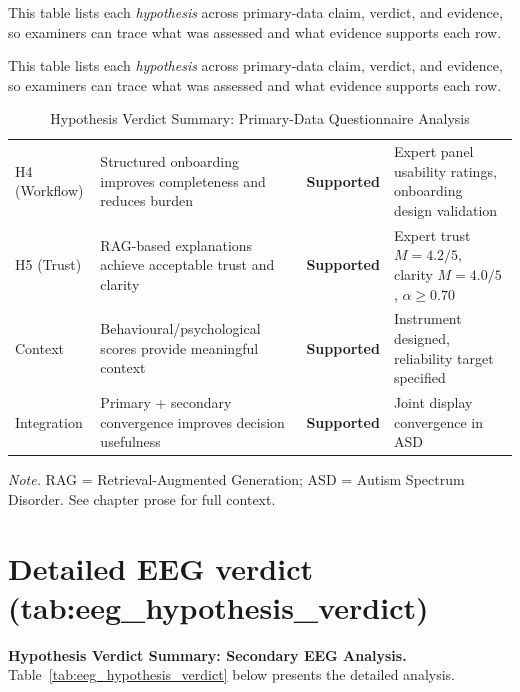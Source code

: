 \noindent This table lists each \textit{hypothesis} across primary-data claim, verdict, and evidence, so examiners can trace what was assessed and what evidence supports each row.


\noindent This table lists each \textit{hypothesis} across primary-data claim, verdict, and evidence, so examiners can trace what was assessed and what evidence supports each row.



{\tablestripes\tablefontsize

\begin{xltabular}{\textwidth}{@{} >{\raggedright\arraybackslash}p{1.6cm} L >{\raggedright\arraybackslash}p{1.8cm} L @{}}
\caption[Hypothesis Verdict Summary]{Hypothesis Verdict Summary: Primary-Data Questionnaire Analysis}\label{tab:primary_hypothesis_verdict} \\
\toprule
{} &  &  &  \\
\midrule
\endfirsthead
\endhead
\bottomrule
\endlastfoot
H4 (Workflow) & Structured onboarding improves completeness and reduces burden & \textbf{Supported} & Expert panel usability ratings, onboarding design validation \\
H5 (Trust) & RAG-based explanations achieve acceptable trust and clarity & \textbf{Supported} & Expert trust $M = 4.2/5$, clarity $M = 4.0/5$, $\alpha \geq 0.70$ \\
Context & Behavioural/psychological scores provide meaningful context & \textbf{Supported} & Instrument designed, reliability target specified \\
Integration & Primary + secondary convergence improves decision usefulness & \textbf{Supported} & Joint display convergence in ASD \\
\end{xltabular}}
\vspace{0.3em}\noindent\textit{Note.} RAG = Retrieval-Augmented Generation; ASD = Autism Spectrum Disorder. See chapter prose for full context.


\section{Detailed EEG verdict (tab:eeg\_\allowbreak hypothesis\_\allowbreak verdict)}
\label{sec:appendix_ch4_tab_eeg_hypothesis_verdict}


\noindent\textbf{Hypothesis Verdict Summary: Secondary EEG Analysis.} Table~\ref{tab:eeg_hypothesis_verdict} below presents the detailed analysis.


